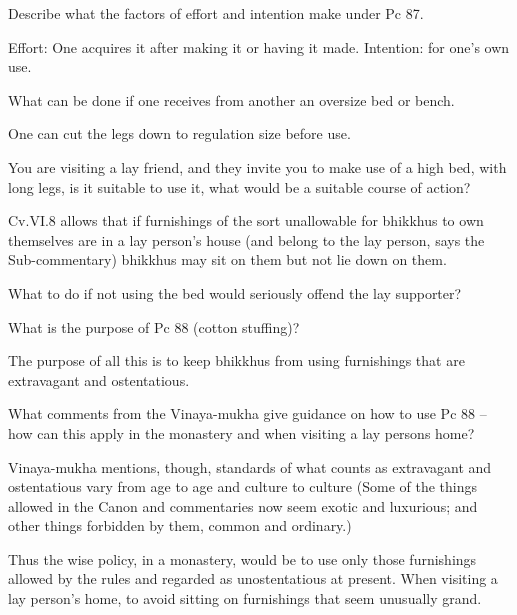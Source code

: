 \bigskip

Describe what the factors of effort and intention make under Pc 87.

\begin{solution}
  Effort: One acquires it after making it or having it made. Intention: for
  one’s own use.
\end{solution}

\bigskip

What can be done if one receives from another an oversize bed or bench.

\begin{solution}
  One can cut the legs down to regulation size before use.
\end{solution}

\bigskip

You are visiting a lay friend, and they invite you to make use of a high bed,
with long legs, is it suitable to use it, what would be a suitable course of
action?

\begin{solution}
  Cv.VI.8 allows that if furnishings of the sort unallowable for bhikkhus to own
  themselves are in a lay person’s house (and belong to the lay person, says the
  Sub-commentary) bhikkhus may sit on them but not lie down on them.
\end{solution}

\bigskip

What to do if not using the bed would seriously offend the lay supporter?


What is the purpose of Pc 88 (cotton stuffing)? 

\begin{solution}
  The purpose of all this is to keep bhikkhus from using furnishings that are
  extravagant and ostentatious.
\end{solution}

\bigskip

What comments from the Vinaya-mukha give guidance on how to use Pc 88 – how
can this apply in the monastery and when visiting a lay persons home?

\begin{solution}
  Vinaya-mukha mentions, though, standards of what counts as extravagant and
  ostentatious vary from age to age and culture to culture (Some of the things
  allowed in the Canon and commentaries now seem exotic and luxurious; and other
  things forbidden by them, common and ordinary.)

  Thus the wise policy, in a monastery, would be to use only those furnishings
  allowed by the rules and regarded as unostentatious at present. When visiting
  a lay person’s home, to avoid sitting on furnishings that seem unusually
  grand.
\end{solution}

